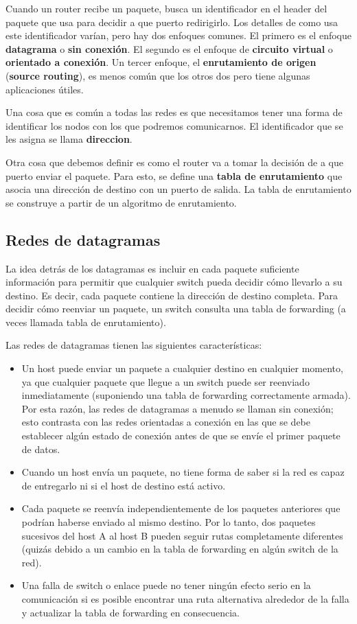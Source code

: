 Cuando un router recibe un paquete, busca un identificador en el header del paquete que usa para decidir a que puerto redirigirlo. Los detalles de como usa este identificador varían, pero hay dos enfoques comunes. El primero es el enfoque \textbf{datagrama} o \textbf{sin conexión}. El segundo es el enfoque de \textbf{circuito virtual} o \textbf{orientado a conexión}. Un tercer enfoque, el \textbf{enrutamiento de origen} (\textbf{source routing}), es menos común que los otros dos pero tiene algunas aplicaciones útiles.

Una cosa que es común a todas las redes es que necesitamos tener una forma de identificar los nodos con los que podremos comunicarnos. El identificador que se les asigna se llama \textbf{direccion}.

Otra cosa que debemos definir es como el router va a tomar la decisión de a que puerto enviar el paquete. Para esto, se define una \textbf{tabla de enrutamiento} que asocia una dirección de destino con un puerto de salida. La tabla de enrutamiento se construye a partir de un algoritmo de enrutamiento.

\subsection{Redes de datagramas}
La idea detrás de los datagramas es incluir en cada paquete suficiente información para permitir que cualquier switch pueda decidir cómo llevarlo a su destino. Es decir, cada paquete contiene la dirección de destino completa. Para decidir cómo reenviar un paquete, un switch consulta una tabla de forwarding (a veces llamada tabla de enrutamiento).

Las redes de datagramas tienen las siguientes características:
\begin{itemize}
  \item Un host puede enviar un paquete a cualquier destino en cualquier momento, ya que cualquier paquete que llegue a un switch puede ser reenviado inmediatamente (suponiendo una tabla de forwarding correctamente armada). Por esta razón, las redes de datagramas a menudo se llaman sin conexión; esto contrasta con las redes orientadas a conexión en las que se debe establecer algún estado de conexión antes de que se envíe el primer paquete de datos.
  \item Cuando un host envía un paquete, no tiene forma de saber si la red es capaz de entregarlo ni si el host de destino está activo.
  \item Cada paquete se reenvía independientemente de los paquetes anteriores que podrían haberse enviado al mismo destino. Por lo tanto, dos paquetes sucesivos del host A al host B pueden seguir rutas completamente diferentes (quizás debido a un cambio en la tabla de forwarding en algún switch de la red).
  \item Una falla de switch o enlace puede no tener ningún efecto serio en la comunicación si es posible encontrar una ruta alternativa alrededor de la falla y actualizar la tabla de forwarding en consecuencia.
 \end{itemize}

